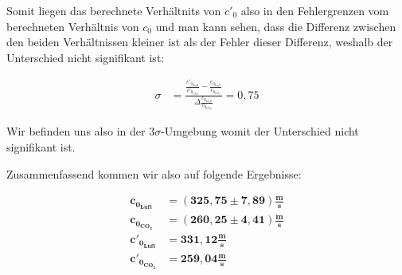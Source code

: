 \documentclass{article}
\begin{document}
Somit liegen das berechnete Verhältnits von $c'_0$ also in den Fehlergrenzen vom berechneten Verhältnis von $c_0$ und man kann sehen, dass die Differenz zwischen den beiden Verhältnissen kleiner ist als der Fehler dieser Differenz, weshalb der Unterschied nicht signifikant ist:

\begin{equation}
    \begin{split}
        \sigma &= \frac{\frac{c'_{0_{Luft}}}{c'_{0_{CO_2}}} - \frac{c_{0_{Luft}}}{c_{0_{CO_2}}}}{\Delta \frac{c_{0_{Luft}}}{c_{0_{CO_2}}}} = 0,75
    \end{split}
\end{equation}

Wir befinden uns also in der $3\sigma$-Umgebung womit der Unterschied nicht signifikant ist.

Zusammenfassend kommen wir also auf folgende Ergebnisse:

\begin{equation}
    \begin{split}
        \bm{c_{0_{Luft}}} &= \bm{(325,75 \pm 7,89) \frac{m}{s}} \\
        \bm{c_{0_{CO_2}}} &= \bm{(260,25 \pm 4,41) \frac{m}{s}} \\
        \bm{c'_{0_{Luft}}} &= \bm{331,12 \frac{m}{s}} \\
        \bm{c'_{0_{CO_2}}} &= \bm{259,04 \frac{m}{s}}
    \end{split}
\end{equation}
\end{document}
